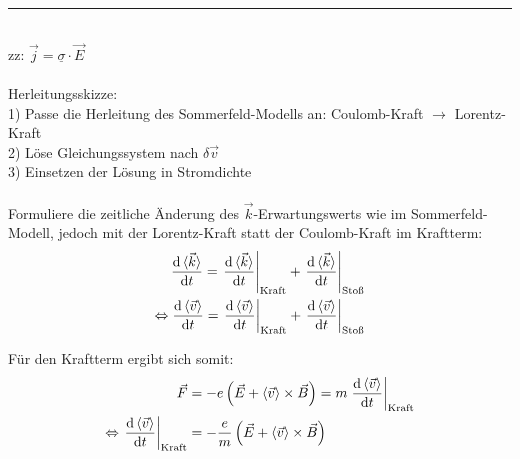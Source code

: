 \documentclass{article}
\newcommand{\diff}{\mathrm{d}}
\newcommand{\lr}[1]{\left(#1\right)}
\begin{document}
\newpage


{\color{violet}
\hrule
	\\
	zz: $\vec{j} = \underline{\sigma} \cdot \vec{E}$\\
	\\
	Herleitungsskizze:\\
	1) Passe die Herleitung des Sommerfeld-Modells an: Coulomb-Kraft $\to$ Lorentz-Kraft \\
	2) Löse Gleichungssystem nach $\delta\vec{v}$ \\
	3) Einsetzen der Lösung in Stromdichte \\
	\\
	Formuliere die zeitliche Änderung des $\vec{k}$-Erwartungswerts wie im Sommerfeld-Modell, jedoch mit der Lorentz-Kraft statt der Coulomb-Kraft im Kraftterm:
		\begin{align*}
			\frac{\diff \braket{\vec{k}}}{\diff t} = \left. \frac{\diff \braket{\vec{k}}}{\diff t} \right|_\text{Kraft} + \left. \frac{\diff \braket{\vec{k}}}{\diff t} \right|_\text{Stoß} \\
			\Leftrightarrow \frac{\diff \braket{\vec{v}}}{\diff t} = \left. \frac{\diff \braket{\vec{v}}}{\diff t} \right|_\text{Kraft} + \left. \frac{\diff \braket{\vec{v}}}{\diff t} \right|_\text{Stoß}
		\end{align*}
	
	Für den Kraftterm ergibt sich somit:
		\begin{align*}
			\vec{F} &= -e\lr{ \vec{E} + \braket{\vec{v}} \times \vec{B} } = m \left. \frac{\diff \braket{\vec{v}}}{\diff t} \right|_\text{Kraft} \\
			\Leftrightarrow \left. \frac{\diff \braket{\vec{v}}}{\diff t} \right|_\text{Kraft} &= -\frac{e}{m} \lr{ \vec{E} + \braket{\vec{v}} \times \vec{B} }
		\end{align*}
	
}
\end{document}
